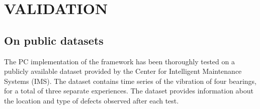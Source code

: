 \section{VALIDATION}
\label{sec:validation}

\subsection{On public datasets}

The PC implementation of the framework has been thoroughly tested on a publicly available dataset provided by the Center for Intelligent Maintenance Systems (IMS).
The dataset contains time series of the vibration of four bearings, for a total of three separate  experiences. The dataset provides information about the location and type of defects observed after each test.

